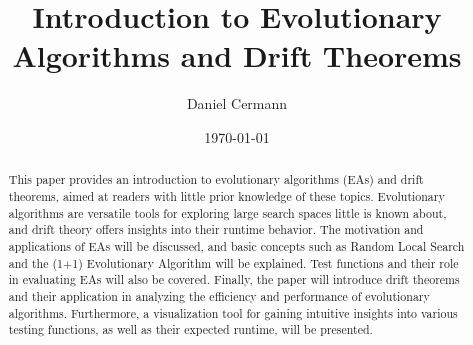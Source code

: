\documentclass[12pt]{article}
\title{Introduction to Evolutionary Algorithms and Drift Theorems}
\author{Daniel Cermann}
\date{\today}
\begin{document}
\maketitle


\begin{abstract}
    This paper provides an introduction to evolutionary algorithms (EAs) and drift theorems, aimed at readers with little prior knowledge of these topics. Evolutionary algorithms are versatile tools for exploring large search spaces little is known about, and drift theory offers insights into their runtime behavior. The motivation and applications of EAs will be discussed, and basic concepts such as Random Local Search and the (1+1) Evolutionary Algorithm will be explained. Test functions and their role in evaluating EAs will also be covered. Finally, the paper will introduce drift theorems and their application in analyzing the efficiency and performance of evolutionary algorithms. Furthermore, a visualization tool for gaining intuitive insights into various testing functions, as well as their expected runtime, will be presented.
\end{abstract}

\tableofcontents \newpage











\end{document}

